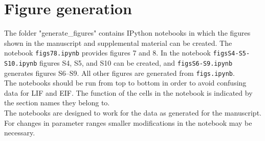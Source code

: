 \documentclass{article}
\begin{document}
\section{Figure generation}
The folder "generate\_figures" contains IPython notebooks in which the figures shown in the manuscript and supplemental material can be created. The notebook \verb!figs78.ipynb! provides figures 7 and 8. In the notebook \verb!figsS4-S5-S10.ipynb! figures S4, S5, and S10 can be created,  and \verb!figsS6-S9.ipynb! generates figures S6--S9. All other figures are generated from \verb!figs.ipynb!.\\
The notebooks should be run from top to bottom in order to avoid confusing data for LIF and EIF. The function of the cells in the notebook is indicated by the section names they belong to.\\
The notebooks are designed to work for the data as generated for the manuscript. For changes in parameter ranges smaller modifications in the notebook may be necessary.
\end{document}
